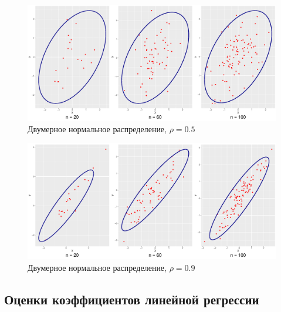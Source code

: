 \documentclass[a4paper]{article}
\begin{document}
\begin{figure}[H]
    \centering
    \includegraphics[width = \textwidth, height = 7 cm]{LabSrcs/resources/ellipse_rho_0.5.pdf}
    \caption{Двумерное нормальное распределение, $\rho=0.5$}
    \label{fig:el60}
\end{figure}
\begin{figure}[H]
    \centering
    \includegraphics[width = \textwidth, height = 7 cm]{LabSrcs/resources/ellipse_rho_0.9.pdf}
    \caption{Двумерное нормальное распределение, $\rho=0.9$}
    \label{fig:el100}
\end{figure}
\subsection{Оценки коэффициентов линейной регрессии}
\end{document}
